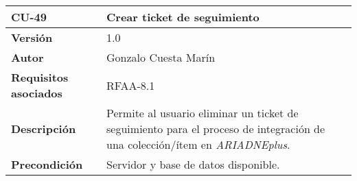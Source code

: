 \begin{longtable}[]{@{}ll@{}}
\toprule
\begin{minipage}[b]{0.16\columnwidth}\raggedright
\textbf{CU-49}\strut
\end{minipage} & \begin{minipage}[b]{0.78\columnwidth}\raggedright
\textbf{Crear ticket de seguimiento}\strut
\end{minipage}\tabularnewline
\midrule
\endhead
\begin{minipage}[t]{0.16\columnwidth}\raggedright
\textbf{Versión}\strut
\end{minipage} & \begin{minipage}[t]{0.78\columnwidth}\raggedright
1.0\strut
\end{minipage}\tabularnewline
\begin{minipage}[t]{0.16\columnwidth}\raggedright
\textbf{Autor}\strut
\end{minipage} & \begin{minipage}[t]{0.78\columnwidth}\raggedright
Gonzalo Cuesta Marín\strut
\end{minipage}\tabularnewline
\begin{minipage}[t]{0.16\columnwidth}\raggedright
\textbf{Requisitos asociados}\strut
\end{minipage} & \begin{minipage}[t]{0.78\columnwidth}\raggedright
RFAA-8.1\strut
\end{minipage}\tabularnewline
\begin{minipage}[t]{0.16\columnwidth}\raggedright
\textbf{Descripción}\strut
\end{minipage} & \begin{minipage}[t]{0.78\columnwidth}\raggedright
Permite al usuario eliminar un ticket de seguimiento para el proceso de
integración de una colección/ítem en \emph{ARIADNEplus}.\strut
\end{minipage}\tabularnewline
\begin{minipage}[t]{0.16\columnwidth}\raggedright
\textbf{Precondición}\strut
\end{minipage} & \begin{minipage}[t]{0.78\columnwidth}\raggedright
Servidor y base de datos disponible.


\end{minipage}
\end{longtable}
